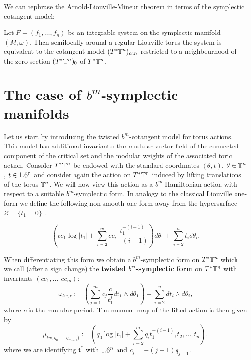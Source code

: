 We can rephrase the Arnold-Liouville-Mineur theorem in terms of the symplectic cotangent model:

\begin{theorem} Let $F=(f_1,\ldots,f_n)$ be an integrable system on the symplectic manifold $(M,\omega)$. Then semilocally around a regular Liouville torus the system is equivalent to the cotangent model $(T^\ast \mathbb{T}^n)_{can}$ restricted to a neighbourhood of the zero section $(T^\ast \mathbb{T}^n)_0$ of $T^\ast \mathbb{T}^n$.
\end{theorem}


\section{The case of $b^m$-symplectic manifolds}



Let us start by introducing the twisted $b^m$-cotangent model for torus actions. This model has additional invariants: the modular vector field of the connected component of the critical set and the modular weights of the associated toric action.
Consider $T^\ast \mathbb{T}^n$ be endowed with the standard coordinates $(\theta, t)$, $\theta \in \mathbb{T}^n$, $t \in 1.6^n$ and consider again the action on $T^\ast \mathbb{T}^n$ induced by lifting translations of the torus $\mathbb{T}^n$. We will now  view this action as a $b^m$-Hamiltonian action with respect to a suitable $b^m$-symplectic form. In analogy to the classical Liouville one-form we define the following  non-smooth one-form away from the hypersurface $Z=\{t_1 = 0\}$~:

$$ \left(c c_1 \log|t_1| + \sum_{i=2}^{m}c c_i \frac{t_1^{-(i-1)}}{-(i-1)}\right) d \theta_1 + \sum_{i=2}^n t_i d\theta_i.$$

When differentiating this form we obtain a $b^m$-symplectic form on $T^\ast \mathbb{T}^n$ which we call (after a sign change) the {\bf twisted $b^m$-symplectic form  }on $T^\ast \mathbb{T}^n$ with invariants $(c c_1, \dots, c c_m)$:
\begin{equation}\label{eq:twistedform}
 \omega_{tw, c}:=\left(\sum_{j=1}^m c_j\frac{c}{t_1^j}d t_1\wedge d\theta_1\right) + \sum_{i=2}^{n} d t_i\wedge d\theta_i,
\end{equation}
where $c$ is the modular period.
The moment map of the lifted action  is then given by
\begin{equation}\label{eq:bmucan}\mu_{tw, q_0, \dots, q_{m-1})}:=( q_0 \log|t_1| + \sum_{i=2}^{m}q_i t_1^{-(i-1)} ,t_2, \ldots, t_n),
\end{equation}
where we are identifying $\mathfrak{t^\ast}$ with $1.6^n$ and  $c_j = -(j-1)q_{j-1}$.

